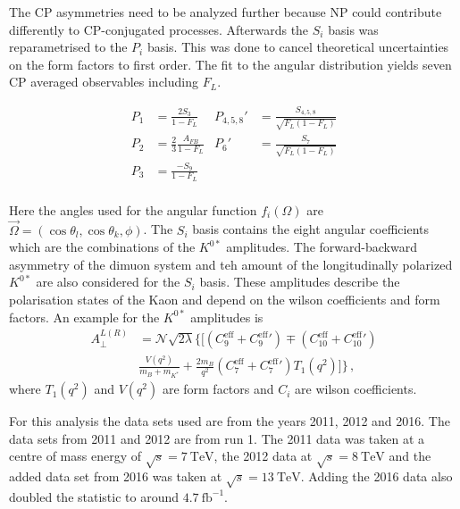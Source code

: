The CP asymmetries need to be analyzed further because NP could contribute differently to CP-conjugated processes.
Afterwards the $S_i$ basis was reparametrised to the $P_i$ basis.
This was done to cancel theoretical uncertainties on the form factors to first order.
The fit to the angular distribution yields seven CP averaged observables including $F_L$.

\begin{align*}
  P_1 &= \frac{2 S_3}{1 - F_L} & P_{4,5,8}\prime &= \frac{S_{4,5,8}}{\sqrt{F_L\left( 1 - F_L \right)}} \\
  P_2 &= \frac{2}{3}\frac{A_{FB}}{1 - F_L} &  P_6\prime &= \frac{S_7}{\sqrt{F_L\left( 1 - F_L \right)}} \\
  P_3 &= \frac{- S_9}{1 - F_L} \\
\end{align*}

Here the angles used for the angular function $f_i(\Omega)$ are $\vec{\Omega} = (\cos\theta_l, \cos\theta_k, \phi)$.
The $S_i$ basis contains the eight angular coefficients which are the combinations of the $K^{0*}$ amplitudes. The forward-backward asymmetry of the dimuon system and teh amount of the longitudinally polarized $K^{0*}$ are also considered for the $S_i$ basis. These amplitudes describe the polarisation states of the Kaon and depend on the wilson coefficients and form factors. An example for the $K^{0*}$ amplitudes is
\begin{align*}
  A_{\bot}^{L(R)} &= \mathcal{N} \sqrt{2\lambda} \{[
  \left( C_9^{\text{eff}} + C_9^{\text{eff}}\prime \right) \mp
  \left( C_{10}^{\text{eff}} + C_{10}^{\text{eff}}\prime \right) \\
  &\frac{V(q^2)}{m_B + m_{K^*}} + \frac{2 m_B}{q^2}
  \left( C_7^{\text{eff}} + C_7^{\text{eff}}\prime \right)T_1(q^2)
  ]\}\,,
\end{align*}
where $T_1(q^2)$ and $V(q^2)$ are form factors and $C_i$ are wilson coefficients.

For this analysis the data sets used are from the years 2011, 2012 and 2016. The data sets from 2011 and 2012 are from run 1.
The 2011 data was taken at a centre of mass energy of $\sqrt{s} = \SI{7}{\tera\electronvolt}$, the 2012 data at $\sqrt{s} = \SI{8}{\tera\electronvolt}$ and the added data set from 2016 was taken at $\sqrt{s} = \SI{13}{\tera\electronvolt}$. Adding the 2016 data also doubled the statistic to around $\SI{4.7}{\femto\barn\tothe{-1}}$.

